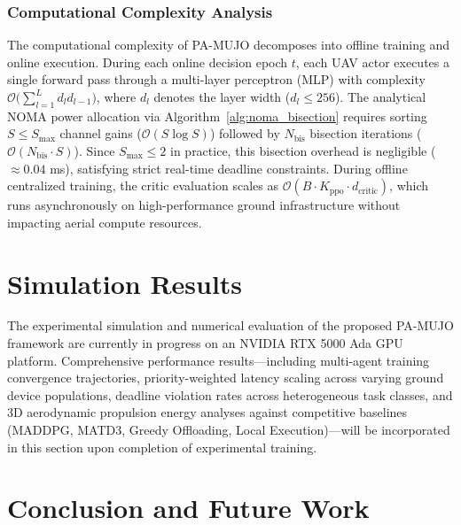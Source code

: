 \documentclass[journal]{IEEEtran}
\begin{document}
\subsubsection{Computational Complexity Analysis}
The computational complexity of PA-MUJO decomposes into offline training and online execution. During each online decision epoch $t$, each UAV actor executes a single forward pass through a multi-layer perceptron (MLP) with complexity $\mathcal{O}\bigl(\sum_{l=1}^L d_l d_{l-1}\bigr)$, where $d_l$ denotes the layer width ($d_l \le 256$). The analytical NOMA power allocation via Algorithm~\ref{alg:noma_bisection} requires sorting $S \le S_{\max}$ channel gains ($\mathcal{O}(S \log S)$) followed by $N_{\mathrm{bis}}$ bisection iterations ($\mathcal{O}(N_{\mathrm{bis}} \cdot S)$). Since $S_{\max} \le 2$ in practice, this bisection overhead is negligible ($\approx 0.04$ ms), satisfying strict real-time deadline constraints. During offline centralized training, the critic evaluation scales as $\mathcal{O}(B \cdot K_{\mathrm{ppo}} \cdot d_{\mathrm{critic}})$, which runs asynchronously on high-performance ground infrastructure without impacting aerial compute resources.


\section{Simulation Results}
\label{section_V}

The experimental simulation and numerical evaluation of the proposed PA-MUJO framework are currently in progress on an NVIDIA RTX 5000 Ada GPU platform. Comprehensive performance results---including multi-agent training convergence trajectories, priority-weighted latency scaling across varying ground device populations, deadline violation rates across heterogeneous task classes, and 3D aerodynamic propulsion energy analyses against competitive baselines (MADDPG, MATD3, Greedy Offloading, Local Execution)---will be incorporated in this section upon completion of experimental training.


\section{Conclusion and Future Work}
\label{con}
\end{document}
